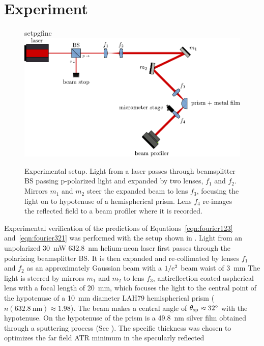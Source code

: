 \section{Experiment}
\begin{figure}[ht]
\centering
{setpgfinc}
\includegraphics[keepaspectratio,width=14cm]{interference/figures/opticalsetup.pdf}
\caption{Experimental setup.  Light from a laser passes through beamsplitter
BS passing p-polarized light and expanded by two lenses, $f_1$ and $f_2$.
Mirrors $m_1$ and $m_2$ steer the expanded beam to lens $f_3$, focusing the
light on to hypotenuse of a hemispherical prism.  Lens $f_4$ re-images the reflected field to a beam profiler where it is recorded.}
\label{fig:opticalsetup}
\end{figure}
Experimental verification of the predictions of Equations~\ref{eqn:fourier123}
and~\ref{eqn:fourier321} was performed with the setup shown in
.  Light from an
unpolarized \SI{30}{\milli\watt} \SI{632.8}{\nano\meter} helium-neon
laser first passes through the polarizing
beamsplitter BS\@.  It is then expanded and re-collimated by lenses $f_1$ and $f_2$ as an
approximately Gaussian beam with a $1/{\mathrm{e}}^2$ beam waist of
\SI{3}{\milli\meter} The light is steered by mirrors $m_1$ and $m_2$ to
lens $f_3$, antireflection coated aspherical lens with a focal length of
\SI{20}{\milli\meter}, which
focuses the light to the central point of the hypotenuse of a
\SI{10}{\milli\meter} diameter LAH79 hemispherical prism
($n(\SI{632.8}{\nano\meter})\approx1.98$).  The beam makes a central angle
of $\theta_\mathrm{sp}\approx\SI{32}{\degree}$ with the hypotenuse.
On the hypotenuse of the prism is a \SI{49.8}{\nano\meter} silver film
obtained through a sputtering process (See ).
The specific thickness was chosen to
optimizes the far field ATR minimum in the specularly reflected
